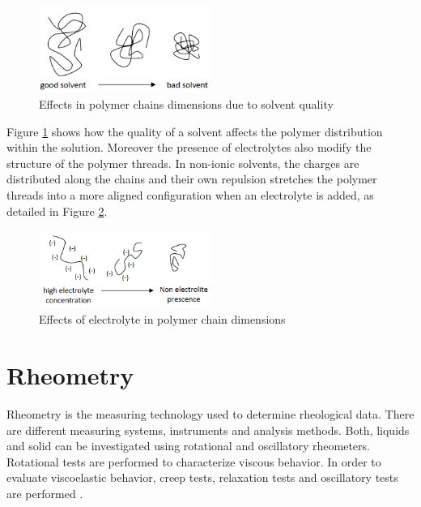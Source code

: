 \begin{figure}[th]
\centering
\includegraphics[width=0.50\textwidth]{./Figures/goodbadsolvent.png}
\decoRule
\caption[Effects in polymer chains dimensions due to solvent quality]{Effects in polymer chains dimensions due to solvent quality \cite{Flores2017}}
\label{fig:goodbadsolvent}
\end{figure}

Figure \ref{fig:goodbadsolvent} shows how the quality of a solvent affects the polymer distribution within the solution. Moreover the presence of electrolytes also modify the structure of the polymer threads. In non-ionic solvents, the charges are distributed along the chains and their own repulsion stretches the polymer threads into a more aligned configuration when an electrolyte is added, as detailed in Figure \ref{fig:electrolyteConcentration}.

\begin{figure}[th]
\centering
\includegraphics[width=0.50\textwidth]{./Figures/electrolyteConcentration.png}
\decoRule
\caption[Effects of electrolyte in polymer chain dimensions]{Effects of electrolyte in polymer chain dimensions \cite{Flores2017}}
\label{fig:electrolyteConcentration}
\end{figure}

\section{Rheometry}
Rheometry is the measuring technology used to determine rheological data. There are different measuring systems, instruments and analysis methods. Both, liquids and solid  can be investigated using rotational and oscillatory rheometers. Rotational tests are performed to characterize viscous behavior. In order to evaluate viscoelastic behavior, creep tests, relaxation tests and oscillatory tests are performed \cite{Flores2017}.

